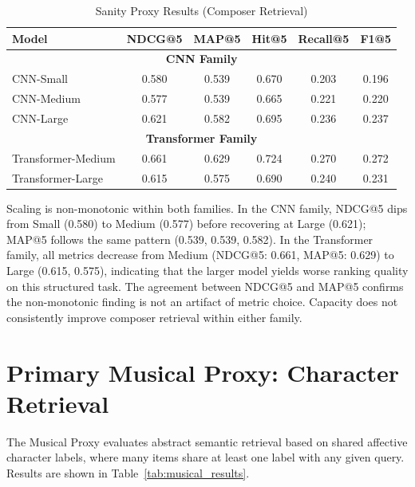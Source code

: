 \documentclass{CPP}
\begin{document}
\begin{table}[!htbp]
\centering
\caption{Sanity Proxy Results (Composer Retrieval)}
\label{tab:sanity_results}
\begin{tabular}{lccccc}
\hline
\textbf{Model} & \textbf{NDCG@5} & \textbf{MAP@5} & \textbf{Hit@5} & \textbf{Recall@5} & \textbf{F1@5} \\
\hline
\multicolumn{6}{c}{\textbf{CNN Family}} \\
\hline
CNN-Small  & 0.580 & 0.539 & 0.670 & 0.203 & 0.196 \\
CNN-Medium & 0.577 & 0.539 & 0.665 & 0.221 & 0.220 \\
CNN-Large  & 0.621 & 0.582 & 0.695 & 0.236 & 0.237 \\
\hline
\multicolumn{6}{c}{\textbf{Transformer Family}} \\
\hline
Transformer-Medium & 0.661 & 0.629 & 0.724 & 0.270 & 0.272 \\
Transformer-Large  & 0.615 & 0.575 & 0.690 & 0.240 & 0.231 \\
\hline
\end{tabular}
\end{table}

Scaling is non-monotonic within both families. In the CNN family, NDCG@5 dips from Small (0.580) to Medium (0.577) before recovering at Large (0.621); MAP@5 follows the same pattern (0.539, 0.539, 0.582). In the Transformer family, all metrics decrease from Medium (NDCG@5: 0.661, MAP@5: 0.629) to Large (0.615, 0.575), indicating that the larger model yields worse ranking quality on this structured task. The agreement between NDCG@5 and MAP@5 confirms the non-monotonic finding is not an artifact of metric choice. Capacity does not consistently improve composer retrieval within either family.

\section{Primary Musical Proxy: Character Retrieval}

The Musical Proxy evaluates abstract semantic retrieval based on shared affective character labels, where many items share at least one label with any given query. Results are shown in Table~\ref{tab:musical_results}.
\end{document}
